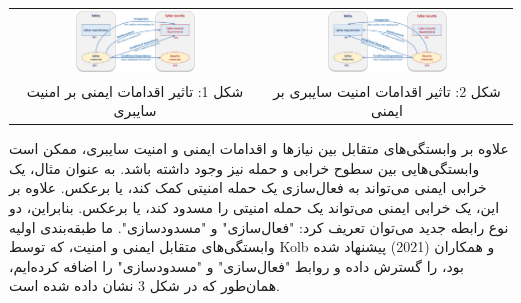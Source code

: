 \documentclass[a4paper,10pt]{article}
\begin{document}
        \begin{table}
            
            \centering
            \begin{tabular}{ c c }
            
                \includegraphics[width=0.5\textwidth]{Image/fig1.jpg}

                &

                \includegraphics[width=0.5\textwidth]{Image/fig2.jpg} \\

                شکل 1: تاثیر اقدامات ایمنی بر امنیت سایبری

                &

                شکل 2: تاثیر اقدامات امنیت سایبری بر ایمنی
                        
            \end{tabular}

        \end{table}

        علاوه بر وابستگی‌های متقابل بین نیازها و اقدامات ایمنی و امنیت سایبری، ممکن است وابستگی‌هایی بین سطوح خرابی و حمله نیز وجود داشته باشد. به عنوان مثال، یک خرابی ایمنی می‌تواند به فعال‌سازی یک حمله امنیتی کمک کند، یا برعکس. علاوه بر این، یک خرابی ایمنی می‌تواند یک حمله امنیتی را مسدود کند، یا برعکس. بنابراین، دو نوع رابطه جدید می‌توان تعریف کرد: "فعال‌سازی" و "مسدودسازی". ما طبقه‌بندی اولیه وابستگی‌های متقابل ایمنی و امنیت، که توسط Kolb و همکاران (2021) پیشنهاد شده بود، را گسترش داده و روابط "فعال‌سازی" و "مسدودسازی" را اضافه کرده‌ایم، همان‌طور که در شکل 3 نشان داده شده است.
\end{document}

